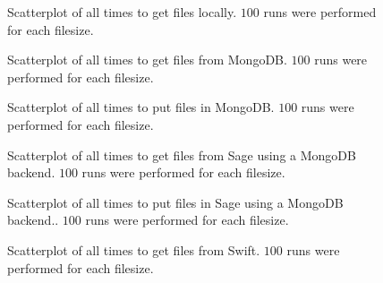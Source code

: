 \label{chapter:appendix}



\begin{figure}[!h]
\centering
{}
\caption[Local Get Scatterplot]{Scatterplot of all times to get files locally. $100$ runs were performed for each filesize.}
\label{fig:localpointlogget}
\end{figure}


\begin{figure}[!h]
\centering
{}
\caption[Mongo Get Scatterplot]{Scatterplot of all times to get files from MongoDB. $100$ runs were performed for each filesize.}
\label{fig:mongopointlogget}
\end{figure}

\begin{figure}[!h]
\centering
{}
\caption[Mongo Put Scatterplot]{Scatterplot of all times to put files in MongoDB. $100$ runs were performed for each filesize.}
\label{fig:mongopointlogput}
\end{figure}


\begin{figure}[!h]
\centering
{}
\caption[SageMongo Get Scatterplot]{Scatterplot of all times to get files from Sage using a MongoDB backend. $100$ runs were performed for each filesize.}
\label{fig:sagemongopointlogget}
\end{figure}

\begin{figure}[!h]
\centering
{}
\caption[SageMongo Put Scatterplot]{Scatterplot of all times to put files in Sage using a MongoDB backend.. $100$ runs were performed for each filesize.}
\label{fig:sagemongopointlogput}
\end{figure}


\begin{figure}[!h]
\centering
{}
\caption[Swift Get Scatterplot]{Scatterplot of all times to get files from Swift. $100$ runs were performed for each filesize.}
\label{fig:swiftpointlogget}
\end{figure}



